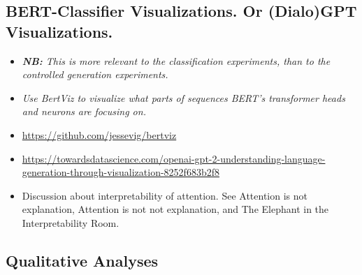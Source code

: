 

\subsection{BERT-Classifier Visualizations. Or (Dialo)GPT Visualizations.}

\begin{itemize}
    \item \textit{\textbf{NB:} This is more relevant to the classification experiments, than to the controlled generation experiments.}
    
    \item \textit{Use BertViz \citep{vig-2019-multiscale} to visualize what parts of sequences BERT's transformer heads and neurons are focusing on.}
    
    \item \url{https://github.com/jessevig/bertviz}
    
    \item \url{https://towardsdatascience.com/openai-gpt-2-understanding-language-generation-through-visualization-8252f683b2f8}
    
    \item Discussion about interpretability of attention. See Attention is not explanation, Attention is not not explanation, and The Elephant in the Interpretability Room.
\end{itemize}




\subsection{Qualitative Analyses}

